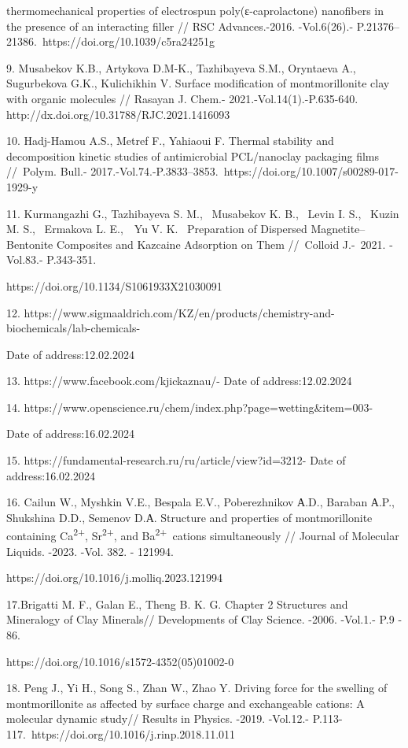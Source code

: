 \begin{noparindent}
thermomechanical properties of
electrospun poly(ε-caprolactone) nanofibers in the presence of an
interacting filler // RSC Advances.-2016. -Vol.6(26).-
P.21376--21386.~https://doi.org/10.1039/c5ra24251g

9. Musabekov K.B., Artykova D.M-K., Tazhibayeva S.M., Oryntaeva A.,
Sugurbekova G.K., Kulichikhin V. Surface modification of montmorillonite
clay with organic molecules // Rasayan J. Chem.-
2021.-Vol.14(1).-P.635-640. http://dx.doi.org/10.31788/RJC.2021.1416093

10. Hadj-Hamou A.S., Metref F., Yahiaoui F. Thermal stability and
decomposition kinetic studies of antimicrobial PCL/nanoclay packaging
films //~Polym. Bull.-
2017.-Vol.74.-P.3833--3853.~https://doi.org/10.1007/s00289-017-1929-y

11. Kurmangazhi G., Tazhibayeva S. M.,~ Musabekov K. B.,~ Levin I. S.,~
Kuzin M. S.,~ Ermakova L. E.,~~Yu V. K.~ Preparation of Dispersed
Magnetite--Bentonite Composites and Kazcaine Adsorption on Them
//~Colloid J.-~2021. -Vol.83.- P.343-351.

https://doi.org/10.1134/S1061933X21030091

12.
https://www.sigmaaldrich.com/KZ/en/products/chemistry-and-biochemicals/lab-chemicals-

Date of address:12.02.2024

13. https://www.facebook.com/kjickaznau/- Date of address:12.02.2024

14. https://www.openscience.ru/chem/index.php?page=wetting\&item=003-

Date of address:16.02.2024

15. https://fundamental-research.ru/ru/article/view?id=3212- Date of
address:16.02.2024

16. Cailun W., Myshkin V.E., Bespala E.V., Poberezhnikov А.D., Baraban
А.P., Shukshina D.D., Semenov D.А. Structure and properties of
montmorillonite containing Ca\textsuperscript{2+},
Sr\textsuperscript{2+}, and Ba\textsuperscript{2+}~cations
simultaneously // Journal of Molecular Liquids. -2023. -Vol. 382. -
121994.

https://doi.org/10.1016/j.molliq.2023.121994

17.Brigatti M. F., Galan E., Theng B. K. G. Chapter 2 Structures and
Mineralogy of Clay Minerals// Developments of Clay Science. -2006.
-Vol.1.- P.9 - 86.~

https://doi.org/10.1016/s1572-4352(05)01002-0

18. Peng J., Yi H., Song S., Zhan W., Zhao Y. Driving force for the
swelling of montmorillonite as affected by surface charge and
exchangeable cations: A molecular dynamic study// Results in Physics.
-2019. -Vol.12.- P.113-117.~https://doi.org/10.1016/j.rinp.2018.11.011


\end{noparindent}
